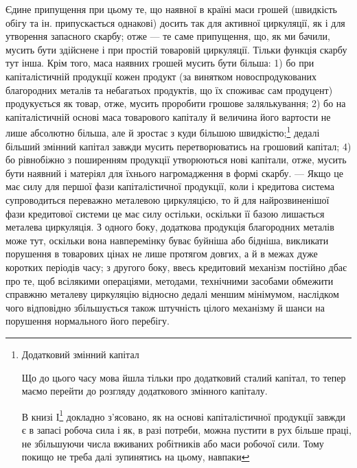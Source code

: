 Єдине припущення при цьому те, що наявної в країні маси грошей
(швидкість обігу та ін. припускається однакові) досить так для активної
циркуляції, як і для утворення запасного скарбу; отже — те саме припущення,
що, як ми бачили, мусить бути здійснене і при простій товаровій
циркуляції. Тільки функція скарбу тут інша. Крім того, маса наявних
грошей мусить бути більша: 1) бо при капіталістичній продукції
кожен продукт (за винятком новоспродукованих благородних металів та
небагатьох продуктів, що їх споживає сам продуцент) продукується як
товар, отже, мусить проробити грошове залялькування; 2) бо на капіталістичній
основі маса товарового капіталу й величина його вартости не
лише абсолютно більша, але й зростає з куди більшою швидкістю;\footnote{
Додатковий змінний капітал

Що до цього часу мова йшла тільки про додатковий сталий капітал,
то тепер маємо перейти до розгляду додаткового змінного
капіталу.

В книзі І\footnote*{
Див. „Капітал“, т. I, розділ 23, § 3. — \emph{Ред.}
} докладно з’ясовано, як на основі капіталістичної продукції
завжди є в запасі робоча сила і як, в разі потреби, можна пустити
в рух більше праці, не збільшуючи числа вживаних робітників або маси
робочої сили. Тому покищо не треба далі зупинятись на цьому, навпаки
} дедалі більший змінний капітал завжди мусить перетворюватись на
грошовий капітал; 4) бо рівнобіжно з поширенням продукції утворюються
нові капітали, отже, мусить бути наявний і матеріял для їхнього нагромадження
в формі скарбу. — Якщо це має силу для першої фази капіталістичної
продукції, коли і кредитова система супроводиться переважно
металевою циркуляцією, то й для найрозвиненішої фази кредитової
системи це має силу остільки, оскільки її базою лишається металева
циркуляція. З одного боку, додаткова продукція благородних металів
може тут, оскільки вона навперемінку буває буйніша або бідніша,
викликати порушення в товарових цінах не лише протягом довгих, а й
в межах дуже коротких періодів часу; з другого боку, ввесь кредитовий
механізм постійно дбає про те, щоб всілякими операціями, методами,
технічними засобами обмежити справжню металеву циркуляцію відносно
дедалі меншим мінімумом, наслідком чого відповідно збільшується також
штучність цілого механізму й шанси на порушення нормального його
перебігу.

